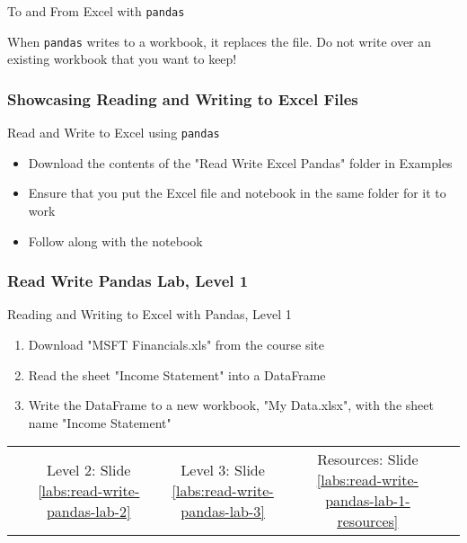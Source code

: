 \documentclass[handout, 11pt]{beamer}
\begin{document}
\begin{section}{To and From Excel with \texttt{pandas}}
\begin{frame}[fragile]
\begin{alertblock}
When
\texttt{pandas}
writes to a workbook, it replaces the file. Do not write over an existing workbook that you want to keep!
\end{alertblock}
\end{frame}
\begin{frame}
\frametitle{Showcasing Reading and Writing to Excel Files}
{
\begin{block}{Read and Write to Excel using \texttt{pandas}}
\begin{itemize}
\item Download the contents of the "Read Write Excel Pandas" folder in Examples
\item Ensure that you put the Excel file and notebook in the same folder for it to work
\item Follow along with the notebook
\end{itemize}
\end{block}
}
\end{frame}
\begin{frame}
\frametitle{Read Write Pandas Lab, Level 1}
{
\begin{block}{Reading and Writing to Excel with Pandas, Level 1}
\begin{enumerate}
\item Download "MSFT Financials.xls" from the course site
\item Read the sheet "Income Statement" into a DataFrame
\item Write the DataFrame to a new workbook, "My Data.xlsx", with the sheet name "Income Statement"
\end{enumerate}
\vfill
\begin{tabular*}{\textwidth}{@{\extracolsep{\fill}}ccccc}
\toprule
\hfill & Level 2: Slide \textcolor{blue}{\underline{\ref{labs:read-write-pandas-lab-2}}} & Level 3: Slide \textcolor{blue}{\underline{\ref{labs:read-write-pandas-lab-3}}} & Resources: Slide \textcolor{blue}{\underline{\ref{labs:read-write-pandas-lab-1-resources}}} & \hfill\\

\end{tabular*}
\end{block}
}
\label{labs:read-write-pandas-lab-1}
\end{frame}
\end{section}
\end{document}
